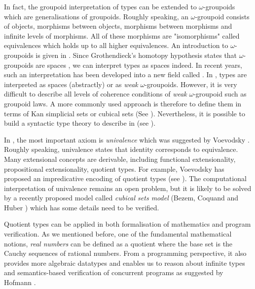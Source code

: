 In fact, the groupoid interpretation of types can be extended to $\omega$-groupoids which are generalisations of groupoids. Roughly speaking, an $\omega$-groupoid consists of objects, morphisms between objects, morphisms between morphisms and infinite levels of morphisms. All of these morphisms are "isomorphisms" called equivalences which holds up to all higher equivalences. An introduction to $\omega$-groupoids is given in .
Since Grothendieck's homotopy hypothesis states that $\omega$-groupoids are spaces \cite{homotopyhyp}, we can interpret types as spaces indeed. In recent years, such an interpretation has been developed into a new field called \hott. In \hott, types are interpreted as spaces (abstractly) or as \emph{weak} $\omega$-groupoids. However, it is very difficult to describe all levels of coherence conditions of \emph{weak} $\omega$-groupoid such as groupoid laws. A more commonly used approach is therefore to define them in terms of Kan simplicial sets or cubical sets (See ). 
Nevertheless, it is possible to build a syntactic type theory to describe \wog in \itt (see ).


In \hott, the most important axiom is \emph{univalence} which was suggested by Voevodsky \cite{VV}. Roughly speaking, univalence states that identity corresponds to equivalence. Many extensional concepts are derivable, including functional extensionality, propositional extensionality, quotient types. For example, Voevodsky has proposed an impredicative encoding of quotient types (see ). The computational interpretation of univalence remains an open problem, but it is likely to be solved by a recently proposed model called \emph{cubical sets model} (Bezem, Coquand and Huber \cite{bezem2013model}) which has some details need to be verified.


Quotient types can be applied in both formalisation of mathematics and program verification. As we mentioned before, one of the fundamental mathematical notions, \emph{real numbers} can be defined as a quotient where the base set is the Cauchy sequences of rational numbers. 
From a programming perspective,  it also provides more algebraic
datatypes and enables us to reason about infinite types and
semantics-based verification of concurrent programs as suggested by Hofmann \cite{hof:phd}.


